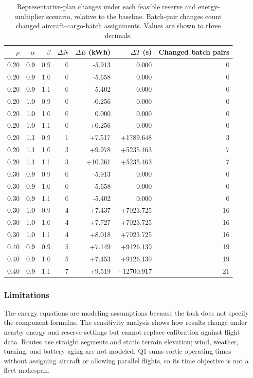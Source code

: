 \documentclass[11pt,a4paper]{article}
\begin{document}
\begin{table}[H]
\centering\scriptsize
\caption{Representative-plan changes under each feasible reserve and energy-multiplier scenario, relative to the baseline. Batch-pair changes count changed aircraft--cargo-batch assignments. Values are shown to three decimals.}
\label{tab:q1-sensitivity-details}
\begin{tabular}{@{}rrrrrrr@{}}
\toprule
$\rho$ & $\alpha$ & $\beta$ & $\Delta N$ & $\Delta E$ (kWh) & $\Delta T$ (s) & Changed batch pairs\\
\midrule
0.20 & 0.9 & 0.9 & 0 & -5.913 & 0.000 & 0\\
0.20 & 0.9 & 1.0 & 0 & -5.658 & 0.000 & 0\\
0.20 & 0.9 & 1.1 & 0 & -5.402 & 0.000 & 0\\
0.20 & 1.0 & 0.9 & 0 & -0.256 & 0.000 & 0\\
0.20 & 1.0 & 1.0 & 0 & 0.000 & 0.000 & 0\\
0.20 & 1.0 & 1.1 & 0 & +0.256 & 0.000 & 0\\
0.20 & 1.1 & 0.9 & 1 & +7.517 & +1789.648 & 3\\
0.20 & 1.1 & 1.0 & 3 & +9.978 & +5235.463 & 7\\
0.20 & 1.1 & 1.1 & 3 & +10.261 & +5235.463 & 7\\
0.30 & 0.9 & 0.9 & 0 & -5.913 & 0.000 & 0\\
0.30 & 0.9 & 1.0 & 0 & -5.658 & 0.000 & 0\\
0.30 & 0.9 & 1.1 & 0 & -5.402 & 0.000 & 0\\
0.30 & 1.0 & 0.9 & 4 & +7.437 & +7023.725 & 16\\
0.30 & 1.0 & 1.0 & 4 & +7.727 & +7023.725 & 16\\
0.30 & 1.0 & 1.1 & 4 & +8.018 & +7023.725 & 16\\
0.40 & 0.9 & 0.9 & 5 & +7.149 & +9126.139 & 19\\
0.40 & 0.9 & 1.0 & 5 & +7.453 & +9126.139 & 19\\
0.40 & 0.9 & 1.1 & 7 & +9.519 & +12700.917 & 21\\
\bottomrule
\end{tabular}
\end{table}

\subsubsection{Limitations}
The energy equations are modeling assumptions because the task does not specify the component formulas. The sensitivity analysis shows how results change under nearby energy and reserve settings but cannot replace calibration against flight data. Routes use straight segments and static terrain elevation; wind, weather, turning, and battery aging are not modeled. Q1 sums sortie operating times without assigning aircraft or allowing parallel flights, so its time objective is not a fleet makespan.
\end{document}
